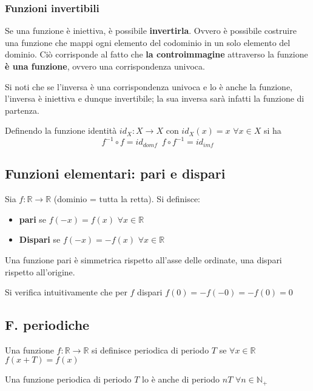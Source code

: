 \documentclass[10pt]{article}
\theoremstyle{plain}
\begin{document}
\subsubsection{Funzioni invertibili}
\begin{prop}
Se una funzione è iniettiva, è possibile \textbf{invertirla}. Ovvero è possibile costruire una funzione che mappi ogni elemento del codominio in un solo elemento del dominio. Ciò corrisponde al fatto che \textbf{la controimmagine} attraverso la funzione \textbf{è una funzione}, ovvero una corrispondenza univoca.
\end{prop}
\begin{oss}
Si noti che se l'inversa è una corrispondenza univoca e lo è anche la funzione, l'inversa è iniettiva e dunque invertibile; la sua inversa sarà infatti la funzione di partenza.
\end{oss}
Definendo la funzione identità $id_X : X \rightarrow X$ con $id_X (x) = x$ $\forall x \in X$ si ha
\[f^{-1} \circ f = id_{dom f} \enspace f \circ f^{-1} = id_{im f}\]

\subsection{Funzioni elementari: pari e dispari}
\begin{defin}
    Sia $f : \mathbb{R} \rightarrow \mathbb{R}$ (dominio = tutta la retta). Si definisce:
    \begin{itemize}[label = $\square$]
        \item \textbf{pari} se $f(-x) = f(x)$ $\forall x \in \mathbb{R}$
        \item \textbf{Dispari} se $f(-x) = - f(x)$ $\forall x \in \mathbb{R}$
    \end{itemize}
    Una funzione pari è simmetrica rispetto all'asse delle ordinate, una dispari rispetto all'origine.
\end{defin}
Si verifica intuitivamente che per $f$ dispari $f(0) = - f(-0) = - f(0) = 0$

\subsection{F. periodiche}
\begin{defin}
    Una funzione $f : \mathbb{R} \rightarrow \mathbb{R}$ si definisce periodica di periodo $T$ se $\forall x \in \mathbb{R}$ $f(x+T) = f(x)$
    \end{defin}
    Una funzione periodica di periodo $T$ lo è anche di periodo $nT$ $\forall n \in \mathbb{N}_+$
\end{document}
